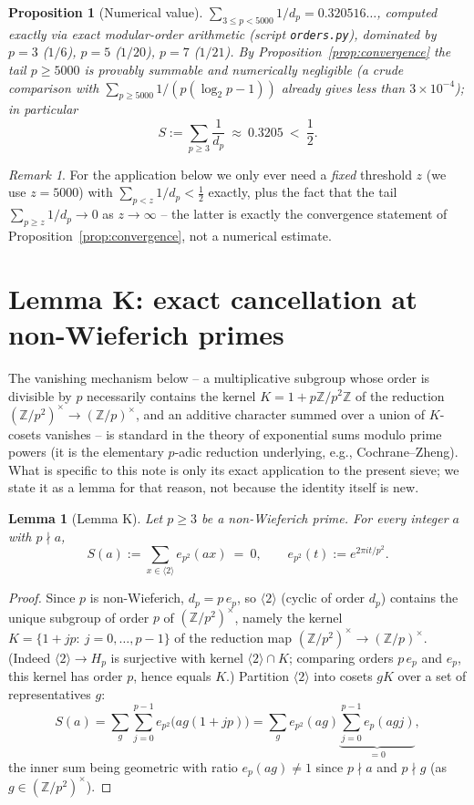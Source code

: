 \documentclass[11pt]{article}
\theoremstyle{plain}
\newtheorem{lemma}[theorem]{Lemma}
\newtheorem{proposition}[theorem]{Proposition}
\theoremstyle{definition}
\theoremstyle{remark}
\newtheorem{remark}[theorem]{Remark}
\newcommand{\Z}{\mathbb{Z}}
\newcommand{\dpp}{d_p}
\newcommand{\ep}{e_p}
\begin{document}
\begin{proposition}[Numerical value]\label{prop:pivot}
$\sum_{3\le p<5000}1/\dpp=0.320516\ldots$, computed exactly via exact
modular-order arithmetic (script \texttt{orders.py}), dominated by $p=3$
($1/6$), $p=5$ ($1/20$), $p=7$ ($1/21$). By Proposition~\ref{prop:convergence}
the tail $p\ge5000$ is provably summable and numerically negligible (a crude
comparison with $\sum_{p\ge5000}1/(p(\log_2p-1))$ already gives less than
$3\times10^{-4}$); in particular
\[
S:=\sum_{p\ge3}\frac1{\dpp}\ \approx\ 0.3205\ <\ \frac12.
\]
\end{proposition}

\begin{remark}
For the application below we only ever need a \emph{fixed} threshold $z$
(we use $z=5000$) with $\sum_{p<z}1/\dpp<\tfrac12$ exactly, plus the fact
that the tail $\sum_{p\ge z}1/\dpp\to0$ as $z\to\infty$ -- the latter is
exactly the convergence statement of Proposition~\ref{prop:convergence}, not
a numerical estimate.
\end{remark}

\section{Lemma K: exact cancellation at non-Wieferich primes}\label{sec:K}

The vanishing mechanism below -- a multiplicative subgroup whose order is
divisible by $p$ necessarily contains the kernel $K=1+p\Z/p^2\Z$ of the
reduction $(\Z/p^2)^\times\to(\Z/p)^\times$, and an additive character summed
over a union of $K$-cosets vanishes -- is standard in the theory of exponential
sums modulo prime powers (it is the elementary $p$-adic reduction underlying,
e.g., Cochrane--Zheng). What is specific to this note is only its exact
application to the present sieve; we state it as a lemma for that reason, not
because the identity itself is new.

\begin{lemma}[Lemma K]\label{lem:K}
Let $p\ge3$ be a non-Wieferich prime. For every integer $a$ with $p\nmid a$,
\[
S(a):=\sum_{x\in\langle2\rangle}e_{p^2}(ax)\ =\ 0,
\qquad e_{p^2}(t):=e^{2\pi it/p^2}.
\]
\end{lemma}
\begin{proof}
Since $p$ is non-Wieferich, $\dpp=p\,\ep$, so $\langle2\rangle$ (cyclic of
order $\dpp$) contains the unique subgroup of order $p$ of
$(\Z/p^2)^\times$, namely the kernel
$K=\{1+jp:\ j=0,\dots,p-1\}$ of the reduction map
$(\Z/p^2)^\times\to(\Z/p)^\times$. (Indeed $\langle2\rangle\to H_p$ is
surjective with kernel $\langle2\rangle\cap K$; comparing orders $p\,\ep$ and
$\ep$, this kernel has order $p$, hence equals $K$.) Partition
$\langle2\rangle$ into cosets $gK$ over a set of representatives $g$:
\[
S(a)=\sum_{g}\sum_{j=0}^{p-1}e_{p^2}\bigl(ag(1+jp)\bigr)
=\sum_{g}e_{p^2}(ag)\underbrace{\sum_{j=0}^{p-1}e_p(agj)}_{=0},
\]
the inner sum being geometric with ratio $e_p(ag)\ne1$ since $p\nmid a$ and
$p\nmid g$ (as $g\in(\Z/p^2)^\times$).
\end{proof}
\end{document}
